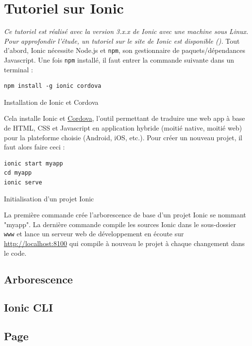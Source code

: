 \documentclass[a4paper, 12pt]{article}
\newenvironment{code}{\captionsetup{type=listing}}{}
\begin{document}
\section{Tutoriel sur Ionic}
\textit{Ce tutoriel est réalisé avec la version 3.x.x de Ionic avec une machine sous Linux. Pour approfondir l'étude, 
un tutoriel sur le site de Ionic est disponible (\cite{ref0}).}
\bigbreak
Tout d'abord, Ionic nécessite Node.js et \texttt{npm}, son gestionnaire de paquets/dépendances Javascript. 
Une fois \texttt{npm} installé, il faut entrer la commande suivante dans un terminal :
\begin{code}
    \begin{verbatim}
npm install -g ionic cordova
    \end{verbatim}
    \caption{Installation de Ionic et Cordova}
\end{code}
Cela installe Ionic et \href{https://cordova.apache.org}{Cordova}, l'outil permettant de traduire une web app à base de 
HTML, CSS et Javascript en application hybride (moitié native, moitié web) pour la plateforme choisie (Android, iOS, etc.). 
Pour créer un nouveau projet, il faut alors faire ceci :
\begin{code}
    \begin{verbatim}
ionic start myapp
cd myapp
ionic serve
    \end{verbatim}
    \caption{Initialisation d'un projet Ionic}
\end{code}
La première commande crée l'arborescence de base d'un projet Ionic se nommant "myapp". 
La dernière commande compile les sources Ionic dans le sous-dossier \texttt{www}
et lance un serveur web de développement en écoute sur \url{http://localhost:8100} qui compile à nouveau le projet à chaque 
changement dans le code.

\subsection{Arborescence}
\subsection{Ionic CLI}
\subsection{Page}
\end{document}
